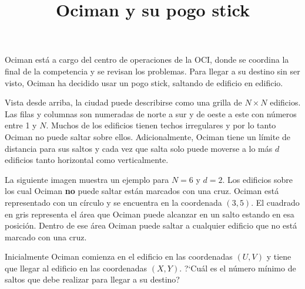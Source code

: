 \documentclass{oci}
\title{Ociman y su pogo stick}
\begin{document}
\begin{problemDescription}
Ociman está a cargo del centro de operaciones de la OCI, donde se coordina la
final de la competencia y se revisan los problemas.
Para llegar a su destino sin ser visto, Ociman ha decidido usar un pogo stick,
saltando de edificio en edificio.

Vista desde arriba, la ciudad puede describirse como una grilla de $N\times N$
edificios.
Las filas y columnas son numeradas de norte a sur y de oeste a este con números
entre 1 y $N$.
Muchos de los edificios tienen techos irregulares y por lo tanto Ociman no
puede saltar sobre ellos.
Adicionalmente, Ociman tiene un límite de distancia para sus saltos y cada vez
que salta solo puede moverse a lo más $d$ edificios tanto horizontal como
verticalmente.

La siguiente imagen muestra un ejemplo para $N=6$ y $d=2$.
Los edificios sobre los cual Ociman \textbf{no} puede saltar están marcados con
una cruz.
Ociman está representado con un círculo y se encuentra en la coordenada $(3, 5)$.
El cuadrado en gris representa el área que Ociman puede alcanzar en un salto
estando en esa posición.
Dentro de ese área Ociman puede saltar a cualquier edificio que no está marcado
con una cruz.

\begin{center}
\end{center}

Inicialmente Ociman comienza en el edificio en las coordenadas $(U, V)$ y tiene
que llegar al edificio en las coordenadas $(X, Y)$.
?`Cuál es el número mínimo de saltos que debe realizar para llegar a su destino? 
\end{problemDescription}
\end{document}
